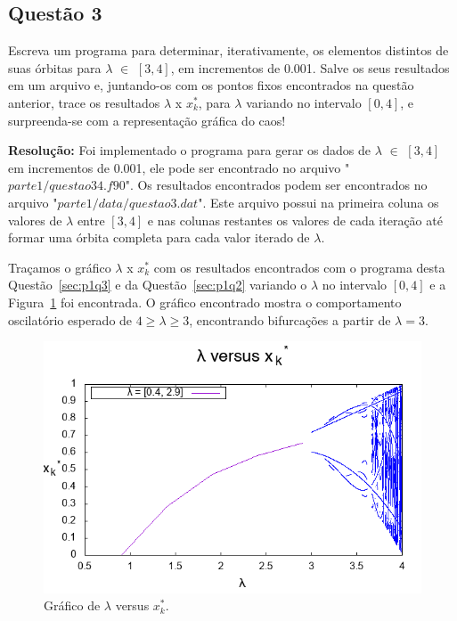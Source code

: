 \documentclass[12pt]{article}
\begin{document}
\subsection*{Questão 3}
\label{sec:p1q3}
Escreva um programa para determinar, iterativamente, os elementos distintos de suas órbitas para $\lambda$ $\in$ $[3, 4]$, em incrementos de 0.001. Salve os seus resultados em um arquivo e, juntando-os com os pontos fixos encontrados na questão anterior, trace os resultados $\lambda$ x $x_{k}^{*}$, para $\lambda$ variando no intervalo $[0, 4]$, e surpreenda-se com a representação gráfica do caos!

\textbf{Resolução:}
Foi implementado o programa para gerar os dados de $\lambda$ $\in$ $[3, 4]$ em incrementos de 0.001, ele pode ser encontrado no arquivo "$\textit{parte1/questao34.f90}$". Os resultados encontrados podem ser encontrados no arquivo "$\textit{parte1/data/questao3.dat}$". Este arquivo possui na primeira coluna os valores de $\lambda$ entre $[3, 4]$ e nas colunas restantes os valores de cada iteração até formar uma órbita completa para cada valor iterado de $\lambda$.

Traçamos o gráfico $\lambda$ x $x_{k}^{*}$ com os resultados encontrados com o programa desta Questão~\ref{sec:p1q3} e da Questão~\ref{sec:p1q2} variando o $\lambda$ no intervalo $[0, 4]$ e a Figura~\ref{fig:p1q3} foi encontrada. O gráfico encontrado mostra o comportamento oscilatório esperado de $4 \geq \lambda \geq 3$, encontrando bifurcações a partir de $\lambda = 3$.

\begin{figure}[H]
	\centering
	\includegraphics[width=1\textwidth]{p1q3.png}
	\caption{Gráfico de $\lambda$ versus $x_{k}^{*}$.}
	\label{fig:p1q3}
\end{figure}
\end{document}
